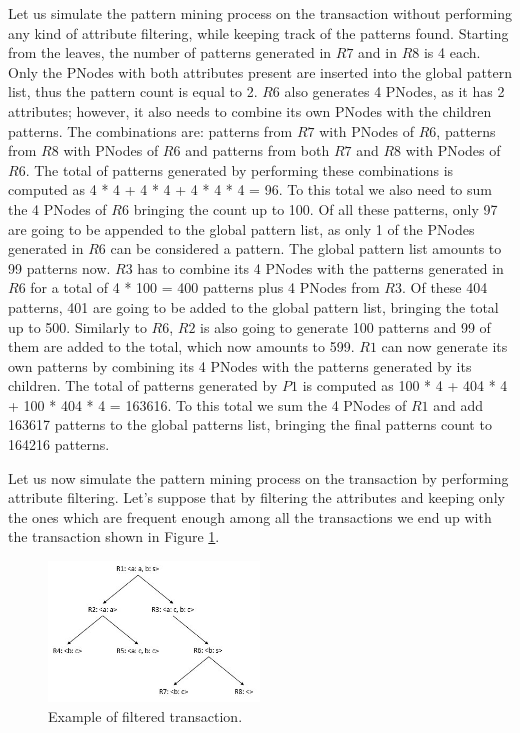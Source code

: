 \documentclass{acm_proc_article-sp-sigmod09}
\begin{document}
Let us simulate the pattern mining process on the transaction without performing any kind of attribute filtering, while keeping track of the patterns found. Starting from the leaves, the number of patterns generated in $R7$ and in $R8$ is 4 each. Only the PNodes with both attributes present are inserted into the global pattern list, thus the pattern count is equal to 2. $R6$ also generates 4 PNodes, as it has 2 attributes; however, it also needs to combine its own PNodes with the children patterns. The combinations are: patterns from $R7$ with PNodes of $R6$, patterns from $R8$ with PNodes of $R6$ and patterns from both $R7$ and $R8$ with PNodes of $R6$. The total of patterns generated by performing these combinations is computed as 4 * 4 + 4 * 4 + 4 * 4 * 4 = 96. To this total we also need to sum the 4 PNodes of $R6$ bringing the count up to 100. Of all these patterns, only 97 are going to be appended to the global pattern list, as only 1 of the PNodes generated in $R6$ can be considered a pattern. The global pattern list amounts to 99 patterns now. $R3$ has to combine its 4 PNodes with the patterns generated in $R6$ for a total of 4 * 100 = 400 patterns plus 4 PNodes from $R3$. Of these 404 patterns, 401 are going to be added to the global pattern list, bringing the total up to 500. Similarly to $R6$, $R2$ is also going to generate 100 patterns and 99 of them are added to the total, which now amounts to 599. $R1$ can now generate its own patterns by combining its 4 PNodes with the patterns generated by its children. The total of patterns generated by $P1$ is computed as 100 * 4 + 404 * 4 + 100 * 404 * 4 = 163616. To this total we sum the 4 PNodes of $R1$ and add 163617 patterns to the global patterns list, bringing the final patterns count to 164216 patterns.

Let us now simulate the pattern mining process on the transaction by performing attribute filtering. Let's suppose that by filtering the attributes and keeping only the ones which are frequent enough among all the transactions we end up with the transaction shown in Figure \ref{fig:transactionTrimmedComplexity}.

\begin{figure}[h!]
\centering
\includegraphics[width=0.5\textwidth]{TrimmedTransactionExample.jpg}
\caption{Example of filtered transaction.}
\label{fig:transactionTrimmedComplexity}
\end{figure}
\end{document}
